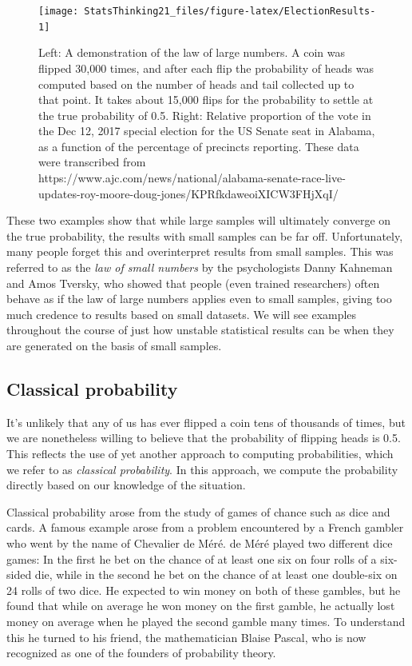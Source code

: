 \documentclass[
  12pt,
]{book}
\begin{document}
\begin{figure}
\texttt{[image: StatsThinking21\_files/figure-latex/ElectionResults-1]} \caption{Left: A demonstration of the law of large numbers.  A coin was flipped 30,000 times, and after each flip the probability of heads was computed based on the number of heads and tail collected up to that point.  It takes about 15,000 flips for the probability to settle at the true probability of 0.5. Right: Relative proportion of the vote in the Dec 12, 2017 special election for the US Senate seat in Alabama, as a function of the percentage of precincts reporting. These data were transcribed from https://www.ajc.com/news/national/alabama-senate-race-live-updates-roy-moore-doug-jones/KPRfkdaweoiXICW3FHjXqI/}\label{fig:ElectionResults}
\end{figure}

These two examples show that while large samples will ultimately converge on the true probability, the results with small samples can be far off. Unfortunately, many people forget this and overinterpret results from small samples. This was referred to as the \emph{law of small numbers} by the psychologists Danny Kahneman and Amos Tversky, who showed that people (even trained researchers) often behave as if the law of large numbers applies even to small samples, giving too much credence to results based on small datasets. We will see examples throughout the course of just how unstable statistical results can be when they are generated on the basis of small samples.

\hypertarget{classical-probability}{%
\subsection{Classical probability}\label{classical-probability}}

It's unlikely that any of us has ever flipped a coin tens of thousands of times, but we are nonetheless willing to believe that the probability of flipping heads is 0.5. This reflects the use of yet another approach to computing probabilities, which we refer to as \emph{classical probability}. In this approach, we compute the probability directly based on our knowledge of the situation.

Classical probability arose from the study of games of chance such as dice and cards. A famous example arose from a problem encountered by a French gambler who went by the name of Chevalier de Méré. de Méré played two different dice games: In the first he bet on the chance of at least one six on four rolls of a six-sided die, while in the second he bet on the chance of at least one double-six on 24 rolls of two dice. He expected to win money on both of these gambles, but he found that while on average he won money on the first gamble, he actually lost money on average when he played the second gamble many times. To understand this he turned to his friend, the mathematician Blaise Pascal, who is now recognized as one of the founders of probability theory.
\end{document}
